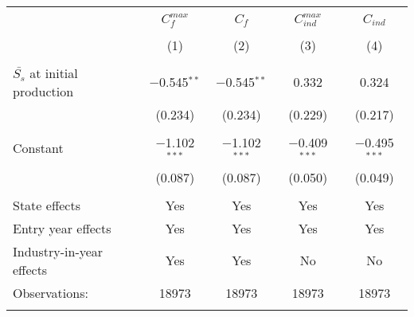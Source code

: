 
\begingroup 
\small 
\begin{tabular}{@{\extracolsep{5pt}}lcccc} 
\\[-1.8ex]\hline 
\hline \\[-1.8ex] 
 & $C^{max}_{f}$ & $C_{f}$ & $C^{max}_{ind}$ & $C_{ind}$ \\ 
\\[-1.8ex] & (1) & (2) & (3) & (4)\\ 
\hline \\[-1.8ex] 
 $\bar{S_{s}}$ at initial production & $-$0.545$^{**}$ & $-$0.545$^{**}$ & 0.332 & 0.324 \\ 
  & (0.234) & (0.234) & (0.229) & (0.217) \\ 
  & & & & \\ 
 Constant & $-$1.102$^{***}$ & $-$1.102$^{***}$ & $-$0.409$^{***}$ & $-$0.495$^{***}$ \\ 
  & (0.087) & (0.087) & (0.050) & (0.049) \\ 
  & & & & \\ 
State effects & Yes & Yes & Yes & Yes \\ 
Entry year effects & Yes & Yes & Yes & Yes \\ 
Industry-in-year effects & Yes & Yes & No & No \\ 
Observations: & 18973 & 18973 & 18973 & 18973 \\ 
\hline \\[-1.8ex] 
\end{tabular} 
\endgroup 
